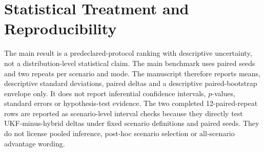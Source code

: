 \documentclass[11pt]{article}
\begin{document}
\section{Statistical Treatment and Reproducibility}

The main result is a predeclared-protocol ranking with descriptive
uncertainty, not a distribution-level statistical claim.  The main benchmark
uses paired seeds and two repeats per scenario and mode.  The manuscript
therefore reports means, descriptive standard deviations, paired deltas and a
descriptive paired-bootstrap envelope only.  It does not report inferential
confidence intervals, \(p\)-values, standard errors or hypothesis-test evidence.
The two completed 12-paired-repeat rows are reported as scenario-level
interval checks because they directly test UKF-minus-hybrid deltas under fixed
scenario definitions and paired seeds.  They do not license pooled inference,
post-hoc scenario selection or all-scenario advantage wording.
\end{document}
